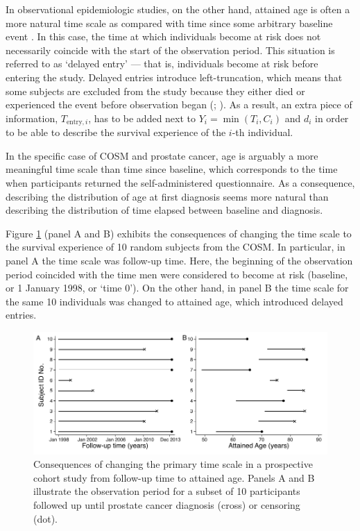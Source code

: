 In observational epidemiologic studies, on the other hand, attained age is often a more natural time scale as compared with time since some arbitrary baseline event \citep{korn_timetoevent_1997, thiebaut_choice_2004, cologne_proportional_2012}. In this case, the time at which individuals become at risk  does not necessarily coincide with the start of the observation period. This situation is referred to as `delayed entry' --- that is, individuals become at risk before entering the study. Delayed entries introduce left-truncation, which means that some subjects are excluded from the study because they either died or experienced the event before observation began (\citealp[section~16.2]{harrell_regression_2001}; \citealp[part~VII]{rabe-hesketh_multilevel_2012}). As a result, an extra piece of information,  $T_{\textrm{entry},i}$, has to be added next to $Y_i=\min(T_i,C_i)$ and $d_i$ in order to be able to describe the survival experience of the $i$-th individual. %

In the specific case of COSM and prostate cancer, age is arguably a more meaningful time scale than time since baseline, which corresponds to the time when participants returned the self-administered questionnaire. As a consequence, describing the distribution of age at first diagnosis seems more natural than describing the distribution of time elapsed between baseline and diagnosis. 

Figure \ref{fig:survivalexperience} (panel A and B) exhibits the consequences of changing the time scale to the survival experience of 10 random subjects from the COSM. In particular, in panel A the time scale was follow-up time. Here, the beginning of the observation period coincided with the time men were considered to become at risk (baseline, or 1 January 1998, or `time 0'). On the other hand, in panel B the time scale for the same 10 individuals was changed to attained age, which introduced delayed entries.

\begin{figure}[ht]
\centering
\includegraphics[width=\linewidth]{figures/survivalexperience.pdf}
\caption[Consequences of changing the primary time scale from follow-up time to attained age]{Consequences of changing the primary time scale in a prospective cohort study from follow-up time to attained age. Panels A and B illustrate the observation period for a subset of 10 participants followed up until prostate cancer diagnosis (cross) or censoring (dot).}
\label{fig:survivalexperience}
\end{figure}


